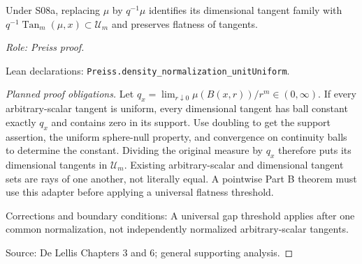 \begin{lemma}
\label{lem:density-normalization}






Under S08a, replacing $\mu$ by $q^{-1}\mu$ identifies its dimensional tangent family with $q^{-1}\operatorname{Tan}_m(\mu,x)\subset\mathcal U_m$ and preserves flatness of tangents.
\par\emph{Role: Preiss proof.}
\par Lean declarations: \texttt{Preiss.density\_normalization\_unitUniform}.
\end{lemma}
\begin{proof}[Planned proof obligations]

Let $q_x=\lim_{r\downarrow0}\mu(B(x,r))/r^m\in(0,\infty)$.
If every arbitrary-scalar tangent is uniform, every dimensional tangent
has ball constant exactly $q_x$ and contains zero in its support.
Use doubling to get the support assertion, the uniform sphere-null property,
and convergence on continuity balls to determine the constant. Dividing the
original measure by $q_x$ therefore puts its dimensional tangents in
$\mathcal U_m$. Existing arbitrary-scalar and dimensional tangent sets are rays
of one another, not literally equal. A pointwise Part B theorem must use this
adapter before applying a universal flatness threshold.
\par Corrections and boundary conditions: A universal gap threshold applies after one common normalization, not independently normalized arbitrary-scalar tangents.
\par Source: De Lellis Chapters 3 and 6; general supporting analysis.
\end{proof}

